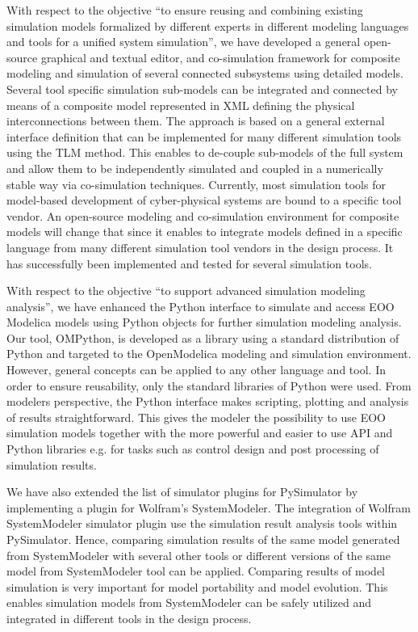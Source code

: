 With respect to the objective “to ensure reusing and combining existing simulation models formalized by different experts in different modeling languages and tools for a unified system simulation”, we have developed a general open-source graphical and textual editor, and co-simulation framework for composite modeling and simulation of several connected subsystems using detailed models. Several tool specific simulation sub-models can be integrated and connected by means of a composite model represented in XML defining the physical interconnections between them. The approach is based on a general external interface definition that can be implemented for many different simulation tools using the TLM method. This enables to de-couple sub-models of the full system and allow them to be independently simulated and coupled in a numerically stable way via co-simulation techniques. Currently, most simulation tools for model-based development of cyber-physical systems are bound to a specific tool vendor. An open-source modeling and co-simulation environment for composite models will change that since it enables to integrate models defined in a specific language from many different simulation tool vendors in the design process. It has successfully been implemented and tested for several simulation tools. 

With respect to the objective “to support advanced simulation modeling analysis”, we have enhanced the Python interface to simulate and access EOO Modelica models using Python objects for further simulation modeling analysis. Our tool, OMPython, is developed as a library using a standard distribution of Python and targeted to the OpenModelica modeling and simulation environment. However, general concepts can be applied to any other language and tool. In order to ensure reusability, only the standard libraries of Python were used. From modelers perspective, the Python interface makes scripting, plotting and analysis of results straightforward. This gives the modeler the possibility to use EOO simulation models together with the more powerful and easier to use API and Python libraries e.g. for tasks such as control design and post processing of simulation results. 

We have also extended the list of simulator plugins for PySimulator by implementing a plugin for Wolfram’s SystemModeler. The integration of Wolfram SystemModeler simulator plugin use the simulation result analysis tools within PySimulator. Hence, comparing simulation results of the same model generated from SystemModeler with several other tools or different versions of the same model from SystemModeler tool can be applied. Comparing results of model simulation is very important for model portability and model evolution. This enables simulation models from SystemModeler can be safely utilized and integrated in different tools in the design process.

